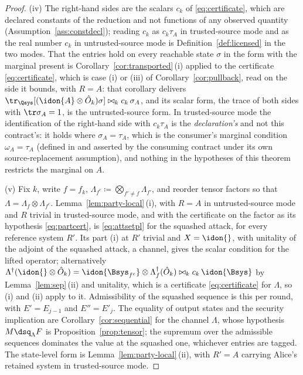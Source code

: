 \begin{proof}
(iv) The right-hand sides are the scalars $c_k$ of \eqref{eq:certificate},
which are declared constants of the reduction and not functions of any observed
quantity (Assumption~\ref{ass:constdecl}); reading $c_k$ as $c_k\tau_A$ in
trusted-source mode and as the real number $c_k$ in untrusted-source mode is
Definition~\ref{def:licensed} in the two modes. That the entries hold on every
reachable state $\sigma$ in the form with the marginal present is
Corollary~\ref{cor:transported}\,(i) applied to the certificate
\eqref{eq:certificate}, which is case (i) or (iii) of
Corollary~\ref{cor:pullback}, read on the side it bounds, with $R=A$: that
corollary delivers
$\tr_{\Qsys}[(\idon{A}\otimes\hat O_k)\sigma]\bowtie_kc_k\,\sigma_A$, and its
scalar form, the trace of both sides with $\tr\sigma_A=1$, is the
untrusted-source form. In trusted-source mode the identification of the
right-hand side with $c_k\tau_A$ is the \emph{declaration's} and not this
contract's: it holds where $\sigma_A=\tau_A$, which is the consumer's
marginal condition $\omega_A=\tau_A$ (defined in
 and asserted by the consuming contract under
its own source-replacement assumption), and nothing in the hypotheses of this
theorem restricts the marginal on $A$.

(v) Fix $k$, write $f=f_k$, $\Lambda_{f^c}\coloneqq\bigotimes_{f'\ne f}
\Lambda_{f'}$, and reorder tensor factors so that
$\Lambda=\Lambda_f\otimes\Lambda_{f^c}$. Lemma~\ref{lem:party-local}\,(i),
with $R=A$ in untrusted-source mode and $R$ trivial in trusted-source mode,
and with the certificate on the factor as its hypothesis
\eqref{eq:partcert}, is \eqref{eq:attsetpl} for the squashed attack, for
every reference system $R'$. Its part (i) at $R'$ trivial and $X=\idon{}$,
with unitality of the adjoint of the squashed attack, a channel, gives the scalar
condition for the lifted operator; alternatively
$\Lambda^{\dagger}(\idon{}\otimes\hat O_k)
=\idon{\Bsys_{f^c}}\otimes\Lambda_f^{\dagger}(\hat O_k)\bowtie_k
c_k\,\idon{\Bsys}$ by Lemma~\ref{lem:sep}\,(ii) and unitality, which is a
certificate \eqref{eq:certificate} for $\Lambda$, so (i) and (ii) apply to
it. Admissibility of the squashed sequence is this per round, with
$E'=E_{j-1}$ and $E''=E'_j$. The equality of output states and the security
implication are Corollary~\ref{cor:sequential} for the channel $\Lambda$,
whose hypothesis $M\dsq_{\Lambda}F$ is Proposition~\ref{prop:tensor}; the
supremum over the admissible sequences dominates the value at the squashed
one, whichever entries are tagged. The state-level form is
Lemma~\ref{lem:party-local}\,(ii), with $R'=A$ carrying Alice's retained
system in trusted-source mode.
\end{proof}
